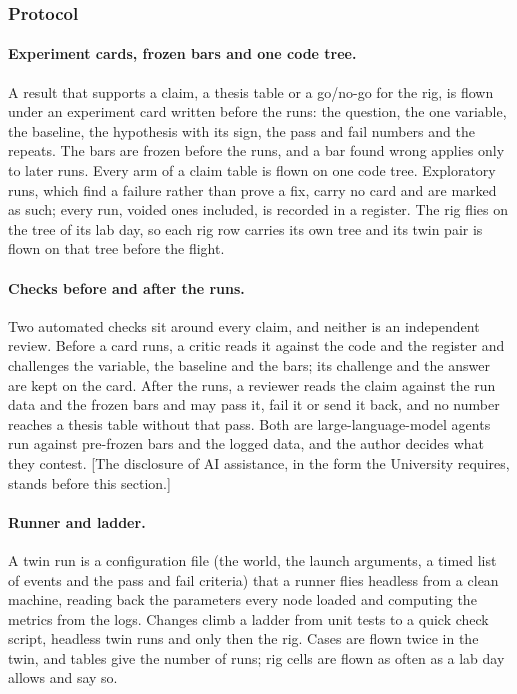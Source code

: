 
\subsubsection{Protocol}
\label{sec:protocol}

\paragraph{Experiment cards, frozen bars and one code tree.} A result that supports a claim, a thesis table or a
go/no-go for the rig, is flown under an experiment card written before the runs: the question, the one variable, the
baseline, the hypothesis with its sign, the pass and fail numbers and the repeats. The bars are frozen before the runs,
and a bar found wrong applies only to later runs. Every arm of a claim table is flown on one code tree. Exploratory runs,
which find a failure rather than prove a fix, carry no card and are marked as such; every run, voided ones included, is
recorded in a register. The rig flies on the tree of its lab day, so each rig row carries its own tree and its twin pair
is flown on that tree before the flight.

\paragraph{Checks before and after the runs.} Two automated checks sit around every claim, and neither is an
independent review. Before a card runs, a critic reads it against the code and the register and challenges the
variable, the baseline and the bars; its challenge and the answer are kept on the card. After the runs, a reviewer
reads the claim against the run data and the frozen bars and may pass it, fail it or send it back, and no number
reaches a thesis table without that pass. Both are large-language-model agents run against pre-frozen bars and
the logged data, and the author decides what they contest. [The disclosure of AI assistance, in the form the
University requires, stands before this section.]

\paragraph{Runner and ladder.} A twin run is a configuration file (the world, the launch arguments, a timed list of
events and the pass and fail criteria) that a runner flies headless from a clean machine, reading back the
parameters every node loaded and computing the metrics from the logs. Changes climb a ladder from unit tests to a
quick check script, headless twin runs and only then the rig. Cases are flown twice in the twin, and tables give the
number of runs; rig cells are flown as often as a lab day allows and say so.
